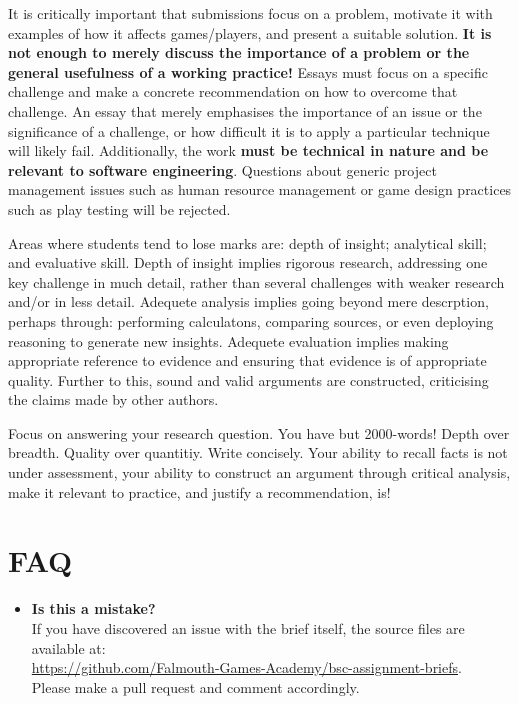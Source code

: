\documentclass{../../fal_assignment}
\begin{document}
It is critically important that submissions focus on a problem, motivate it with examples of how it affects games/players, and present a suitable solution. \textbf{It is not enough to merely discuss the importance of a problem or the general usefulness of a working practice!} Essays must focus on a specific challenge and make a concrete recommendation on how to overcome that challenge. An essay that merely emphasises the importance of an issue or the significance of a challenge, or how difficult it is to apply a particular technique will likely fail. Additionally, the work \textbf{must be technical in nature and be relevant to software engineering}. Questions about generic project management issues such as human resource management or game design practices such as play testing will be rejected.

Areas where students tend to lose marks are: depth of insight; analytical skill; and evaluative skill. Depth of insight implies rigorous research, addressing one key challenge in much detail, rather than several challenges with weaker research and/or in less detail. Adequete analysis implies going beyond mere descrption, perhaps through: performing calculatons, comparing sources, or even deploying reasoning to generate new insights. Adequete evaluation implies making appropriate reference to evidence and ensuring that evidence is of appropriate quality. Further to this, sound and valid arguments are constructed, criticising the claims made by other authors.

Focus on answering your research question. You have but 2000-words! Depth over breadth. Quality over quantitiy. Write concisely. Your ability to recall facts is not under assessment, your ability to construct an argument through critical analysis, make it relevant to practice, and justify a recommendation, is!

\section*{FAQ}

\begin{itemize}  		
    	\item 	\textbf{Is this a mistake?} \\ 	
    		If you have discovered an issue with the brief itself, the source files are available at: \\
    		\url{https://github.com/Falmouth-Games-Academy/bsc-assignment-briefs}.\\
    		 Please make a pull request and comment accordingly.
\end{itemize}
\end{document}
